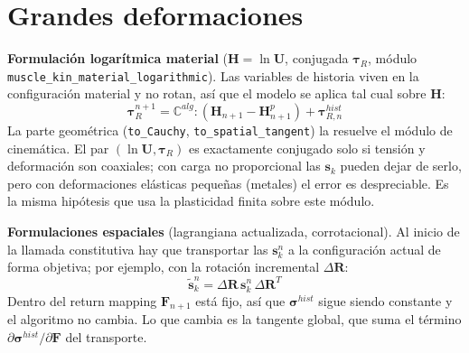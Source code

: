 \documentclass[12pt]{article}
\begin{document}
\section*{Grandes deformaciones}

\textbf{Formulación logarítmica material} ($\pmb{H} = \ln\pmb{U}$, conjugada $\pmb{\tau}_R$, módulo \texttt{muscle\_kin\_material\_logarithmic}). Las variables de historia viven en la configuración material y no rotan, así que el modelo se aplica tal cual sobre $\pmb{H}$:
\[ \pmb{\tau}_R^{n+1} = \mathbb{C}^{alg} : \left(\pmb{H}_{n+1} - \pmb{H}^p_{n+1}\right) + \pmb{\tau}^{hist}_{R,n} \]
La parte geométrica (\texttt{to\_Cauchy}, \texttt{to\_spatial\_tangent}) la resuelve el módulo de cinemática. El par $(\ln\pmb{U}, \pmb{\tau}_R)$ es exactamente conjugado solo si tensión y deformación son coaxiales; con carga no proporcional las $\pmb{s}_k$ pueden dejar de serlo, pero con deformaciones elásticas pequeñas (metales) el error es despreciable. Es la misma hipótesis que usa la plasticidad finita sobre este módulo.

\textbf{Formulaciones espaciales} (lagrangiana actualizada, corrotacional). Al inicio de la llamada constitutiva hay que transportar las $\pmb{s}_k^n$ a la configuración actual de forma objetiva; por ejemplo, con la rotación incremental $\Delta\pmb{R}$:
\[ \tilde{\pmb{s}}_k^n = \Delta\pmb{R}\,\pmb{s}_k^n\,\Delta\pmb{R}^T \]
Dentro del return mapping $\pmb{F}_{n+1}$ está fijo, así que $\pmb{\sigma}^{hist}$ sigue siendo constante y el algoritmo no cambia. Lo que cambia es la tangente global, que suma el término $\partial\pmb{\sigma}^{hist}/\partial\pmb{F}$ del transporte.

\end{document}
